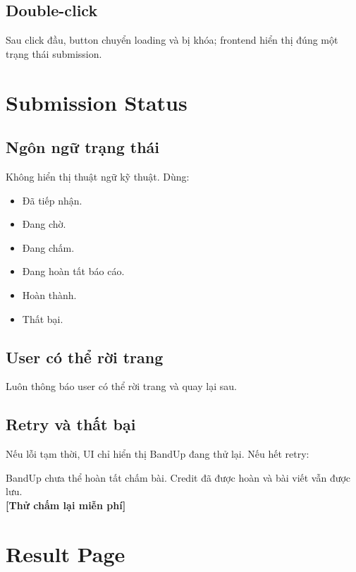 \documentclass[11pt,a4paper]{article}
\begin{document}
\subsection{Double-click}
Sau click đầu, button chuyển loading và bị khóa; frontend hiển thị đúng một trạng thái submission.

\section{Submission Status}

\subsection{Ngôn ngữ trạng thái}
Không hiển thị thuật ngữ kỹ thuật. Dùng:
\begin{itemize}
  \item Đã tiếp nhận.
  \item Đang chờ.
  \item Đang chấm.
  \item Đang hoàn tất báo cáo.
  \item Hoàn thành.
  \item Thất bại.
\end{itemize}

\subsection{User có thể rời trang}
Luôn thông báo user có thể rời trang và quay lại sau.

\subsection{Retry và thất bại}
Nếu lỗi tạm thời, UI chỉ hiển thị BandUp đang thử lại. Nếu hết retry:
\begin{copybox}
BandUp chưa thể hoàn tất chấm bài. Credit đã được hoàn và bài viết vẫn được lưu.\\
\textbf{[Thử chấm lại miễn phí]} 
\end{copybox}

\section{Result Page}
\end{document}
